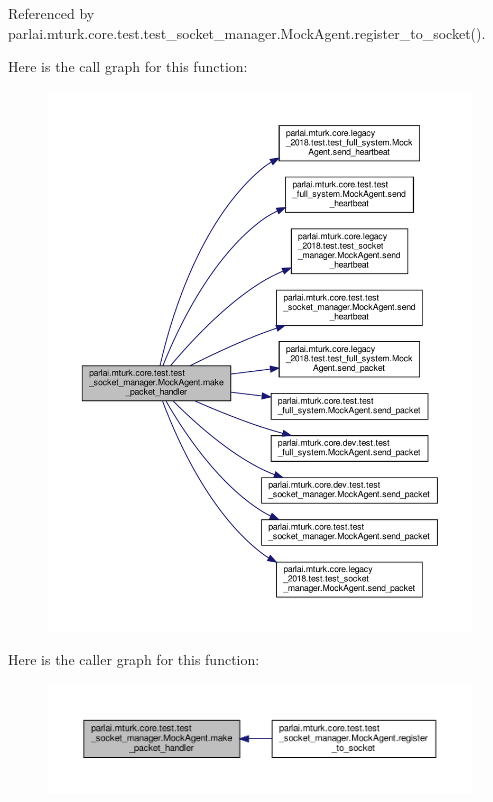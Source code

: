 Referenced by parlai.\+mturk.\+core.\+test.\+test\+\_\+socket\+\_\+manager.\+Mock\+Agent.\+register\+\_\+to\+\_\+socket().

Here is the call graph for this function\+:
\nopagebreak
\begin{figure}[H]
\begin{center}
\leavevmode
\includegraphics[width=350pt]{classparlai_1_1mturk_1_1core_1_1test_1_1test__socket__manager_1_1MockAgent_a06d5e6cb09b2472a0b1972a7bb82ef31_cgraph}
\end{center}
\end{figure}
Here is the caller graph for this function\+:
\nopagebreak
\begin{figure}[H]
\begin{center}
\leavevmode
\includegraphics[width=350pt]{classparlai_1_1mturk_1_1core_1_1test_1_1test__socket__manager_1_1MockAgent_a06d5e6cb09b2472a0b1972a7bb82ef31_icgraph}
\end{center}
\end{figure}

